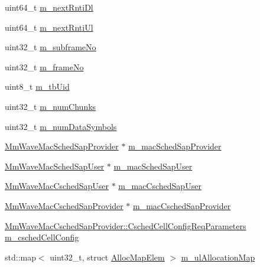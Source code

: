 \begin{DoxyCompactItemize}
uint64\+\_\+t \hyperlink{classns3_1_1MmWaveFlexTtiPfMacScheduler_a8678f0d1bce3f85ace69a8256c432cdb}{m\+\_\+next\+Rnti\+Dl}
\item 
uint64\+\_\+t \hyperlink{classns3_1_1MmWaveFlexTtiPfMacScheduler_a45c548d99fc16a2315c5518200d5f142}{m\+\_\+next\+Rnti\+Ul}
\item 
uint32\+\_\+t \hyperlink{classns3_1_1MmWaveFlexTtiPfMacScheduler_a85e36c03d0ada12366bd2f4e2c09d27c}{m\+\_\+subframe\+No}
\item 
uint32\+\_\+t \hyperlink{classns3_1_1MmWaveFlexTtiPfMacScheduler_a79fe98bb12a2b45327e637a07bc32fea}{m\+\_\+frame\+No}
\item 
uint8\+\_\+t \hyperlink{classns3_1_1MmWaveFlexTtiPfMacScheduler_ad67ede1dc070d024283a2fcd765fded9}{m\+\_\+tb\+Uid}
\item 
uint32\+\_\+t \hyperlink{classns3_1_1MmWaveFlexTtiPfMacScheduler_a433a7275fa7faf484e94152f306d8ca5}{m\+\_\+num\+Chunks}
\item 
uint32\+\_\+t \hyperlink{classns3_1_1MmWaveFlexTtiPfMacScheduler_a38027b9b85a86fab36edc83c71a68211}{m\+\_\+num\+Data\+Symbols}
\item 
\hyperlink{classns3_1_1MmWaveMacSchedSapProvider}{Mm\+Wave\+Mac\+Sched\+Sap\+Provider} $\ast$ \hyperlink{classns3_1_1MmWaveFlexTtiPfMacScheduler_a64ecaf041b715738c023c66564d16a3e}{m\+\_\+mac\+Sched\+Sap\+Provider}
\item 
\hyperlink{classns3_1_1MmWaveMacSchedSapUser}{Mm\+Wave\+Mac\+Sched\+Sap\+User} $\ast$ \hyperlink{classns3_1_1MmWaveFlexTtiPfMacScheduler_a06177d3b0a466e035764a4101cfafc9e}{m\+\_\+mac\+Sched\+Sap\+User}
\item 
\hyperlink{classns3_1_1MmWaveMacCschedSapUser}{Mm\+Wave\+Mac\+Csched\+Sap\+User} $\ast$ \hyperlink{classns3_1_1MmWaveFlexTtiPfMacScheduler_aedfac574320eb2e7dcba418d8b2e028c}{m\+\_\+mac\+Csched\+Sap\+User}
\item 
\hyperlink{classns3_1_1MmWaveMacCschedSapProvider}{Mm\+Wave\+Mac\+Csched\+Sap\+Provider} $\ast$ \hyperlink{classns3_1_1MmWaveFlexTtiPfMacScheduler_ab6d70b7f2cd7341108de1ee78026d0ec}{m\+\_\+mac\+Csched\+Sap\+Provider}
\item 
\hyperlink{structns3_1_1MmWaveMacCschedSapProvider_1_1CschedCellConfigReqParameters}{Mm\+Wave\+Mac\+Csched\+Sap\+Provider\+::\+Csched\+Cell\+Config\+Req\+Parameters} \hyperlink{classns3_1_1MmWaveFlexTtiPfMacScheduler_a26107150e88676e041b690a51f870d8b}{m\+\_\+csched\+Cell\+Config}
\item 
std\+::map$<$ uint32\+\_\+t, struct \hyperlink{structns3_1_1MmWaveFlexTtiPfMacScheduler_1_1AllocMapElem}{Alloc\+Map\+Elem} $>$ \hyperlink{classns3_1_1MmWaveFlexTtiPfMacScheduler_af7da7cec8d296efb29a1fafc2a19bf48}{m\+\_\+ul\+Allocation\+Map}

\end{DoxyCompactItemize}
